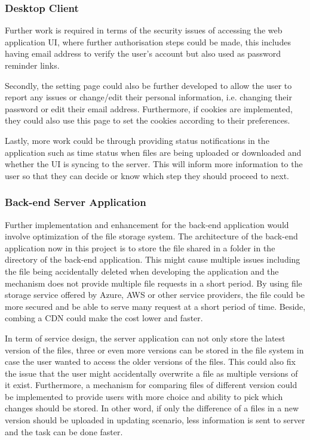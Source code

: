 \documentclass{article}
\begin{document}
\subsubsection{Desktop Client}
Further work is required in terms of the security issues of accessing the web application UI, where further authorisation steps could be made, this includes having email address to verify the user's account but also used as password reminder links.

Secondly, the setting page could also be further developed to allow the user to report any issues or change/edit their personal information, i.e. changing their password or edit their email address. Furthermore, if cookies are implemented, they could also use this page to set the cookies according to their preferences.

Lastly, more work could be through providing status notifications in the application such as time status when files are being uploaded or downloaded and whether the UI is syncing to the server. This will inform more information to the user so that they can decide or know which step they should proceed to next.

\subsubsection{Back-end Server Application}

Further implementation and enhancement for the back-end application would involve optimization of the file storage system. The architecture of the back-end application now in this project is to store the file shared in a folder in the directory of the back-end application. This might cause multiple issues including the file being accidentally deleted when developing the application and the mechanism does not provide multiple file requests in a short period. By using file storage service offered by Azure, AWS or other service providers, the file could be more secured and be able to serve many request at a short period of time. Beside, combing a CDN could make the cost lower and faster.

In term of service design, the server application can not only store the latest version of the files, three or even more versions can be stored in the file system in case the user wanted to access the older versions of the files. This could also fix the issue that the user might accidentally overwrite a file as multiple versions of it exist. Furthermore, a mechanism for comparing files of different version could be implemented to provide users with more choice and ability to pick which changes should be stored. In other word, if only the difference of a files in a new version should be uploaded in updating scenario, less information is sent to server and the task can be done faster.
\end{document}
